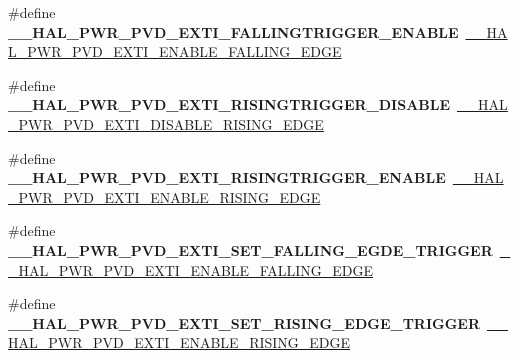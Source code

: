 \begin{DoxyCompactItemize}
\item 
\hypertarget{group___h_a_l___p_w_r___aliased___macros_ga03036e3fb46ad3933576789d7d7290e5}{\#define {\bfseries \-\_\-\-\_\-\-H\-A\-L\-\_\-\-P\-W\-R\-\_\-\-P\-V\-D\-\_\-\-E\-X\-T\-I\-\_\-\-F\-A\-L\-L\-I\-N\-G\-T\-R\-I\-G\-G\-E\-R\-\_\-\-E\-N\-A\-B\-L\-E}~\hyperlink{group___p_w_r___exported___macros_ga5b971478563a00e1ee1a9d8ca8054e08}{\-\_\-\-\_\-\-H\-A\-L\-\_\-\-P\-W\-R\-\_\-\-P\-V\-D\-\_\-\-E\-X\-T\-I\-\_\-\-E\-N\-A\-B\-L\-E\-\_\-\-F\-A\-L\-L\-I\-N\-G\-\_\-\-E\-D\-G\-E}}\label{group___h_a_l___p_w_r___aliased___macros_ga03036e3fb46ad3933576789d7d7290e5}

\item 
\hypertarget{group___h_a_l___p_w_r___aliased___macros_gadc23ac66f1b8c429fe2bf6727220cfea}{\#define {\bfseries \-\_\-\-\_\-\-H\-A\-L\-\_\-\-P\-W\-R\-\_\-\-P\-V\-D\-\_\-\-E\-X\-T\-I\-\_\-\-R\-I\-S\-I\-N\-G\-T\-R\-I\-G\-G\-E\-R\-\_\-\-D\-I\-S\-A\-B\-L\-E}~\hyperlink{group___p_w_r___exported___macros_ga1ca8fd7f3286a176f6be540c75a004c6}{\-\_\-\-\_\-\-H\-A\-L\-\_\-\-P\-W\-R\-\_\-\-P\-V\-D\-\_\-\-E\-X\-T\-I\-\_\-\-D\-I\-S\-A\-B\-L\-E\-\_\-\-R\-I\-S\-I\-N\-G\-\_\-\-E\-D\-G\-E}}\label{group___h_a_l___p_w_r___aliased___macros_gadc23ac66f1b8c429fe2bf6727220cfea}

\item 
\hypertarget{group___h_a_l___p_w_r___aliased___macros_ga90e56e3a788760b51a22ffbbf52bb977}{\#define {\bfseries \-\_\-\-\_\-\-H\-A\-L\-\_\-\-P\-W\-R\-\_\-\-P\-V\-D\-\_\-\-E\-X\-T\-I\-\_\-\-R\-I\-S\-I\-N\-G\-T\-R\-I\-G\-G\-E\-R\-\_\-\-E\-N\-A\-B\-L\-E}~\hyperlink{group___p_w_r___exported___macros_ga7bef3f30c9fe267c99d5240fbf3f878c}{\-\_\-\-\_\-\-H\-A\-L\-\_\-\-P\-W\-R\-\_\-\-P\-V\-D\-\_\-\-E\-X\-T\-I\-\_\-\-E\-N\-A\-B\-L\-E\-\_\-\-R\-I\-S\-I\-N\-G\-\_\-\-E\-D\-G\-E}}\label{group___h_a_l___p_w_r___aliased___macros_ga90e56e3a788760b51a22ffbbf52bb977}

\item 
\hypertarget{group___h_a_l___p_w_r___aliased___macros_ga14336c482ff10c368ab9b7bbf1873894}{\#define {\bfseries \-\_\-\-\_\-\-H\-A\-L\-\_\-\-P\-W\-R\-\_\-\-P\-V\-D\-\_\-\-E\-X\-T\-I\-\_\-\-S\-E\-T\-\_\-\-F\-A\-L\-L\-I\-N\-G\-\_\-\-E\-G\-D\-E\-\_\-\-T\-R\-I\-G\-G\-E\-R}~\hyperlink{group___p_w_r___exported___macros_ga5b971478563a00e1ee1a9d8ca8054e08}{\-\_\-\-\_\-\-H\-A\-L\-\_\-\-P\-W\-R\-\_\-\-P\-V\-D\-\_\-\-E\-X\-T\-I\-\_\-\-E\-N\-A\-B\-L\-E\-\_\-\-F\-A\-L\-L\-I\-N\-G\-\_\-\-E\-D\-G\-E}}\label{group___h_a_l___p_w_r___aliased___macros_ga14336c482ff10c368ab9b7bbf1873894}

\item 
\hypertarget{group___h_a_l___p_w_r___aliased___macros_ga2f1057dd8cf95ab4a33a3dbe5314a5a2}{\#define {\bfseries \-\_\-\-\_\-\-H\-A\-L\-\_\-\-P\-W\-R\-\_\-\-P\-V\-D\-\_\-\-E\-X\-T\-I\-\_\-\-S\-E\-T\-\_\-\-R\-I\-S\-I\-N\-G\-\_\-\-E\-D\-G\-E\-\_\-\-T\-R\-I\-G\-G\-E\-R}~\hyperlink{group___p_w_r___exported___macros_ga7bef3f30c9fe267c99d5240fbf3f878c}{\-\_\-\-\_\-\-H\-A\-L\-\_\-\-P\-W\-R\-\_\-\-P\-V\-D\-\_\-\-E\-X\-T\-I\-\_\-\-E\-N\-A\-B\-L\-E\-\_\-\-R\-I\-S\-I\-N\-G\-\_\-\-E\-D\-G\-E}}\label{group___h_a_l___p_w_r___aliased___macros_ga2f1057dd8cf95ab4a33a3dbe5314a5a2}


\end{DoxyCompactItemize}
